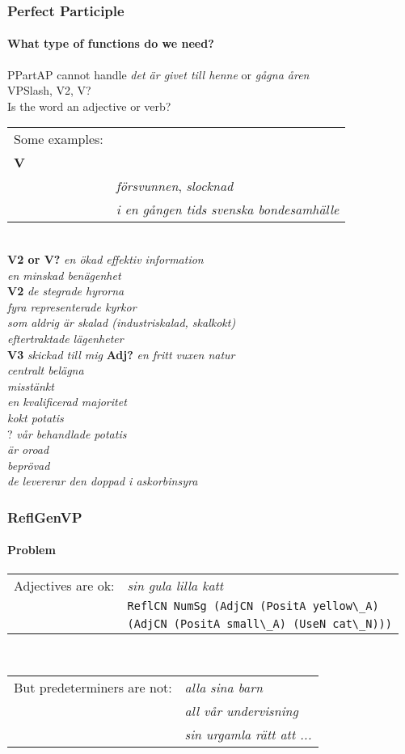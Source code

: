 \documentclass[10pt]{beamer}
\begin{document}
\begin{frame}
\frametitle{Perfect Participle}
\framesubtitle{What type of functions do we need?} 
PPartAP cannot handle \emph{det är givet till henne} or \emph{gågna åren} \\
VPSlash, V2, V?\\
Is the word an adjective or verb? \\
\begin{tabular}{ll}
Some examples: & \\
\textbf{V} & \\
& \emph{försvunnen}, \emph{slocknad} \\
& \emph{i en gången tids svenska bondesamhälle}  \\%
\end{tabular} \\
\textbf{V2 or V?}
\emph{en ökad effektiv information} \\
\emph{en minskad benägenhet} \\
\textbf{V2}
\emph{de stegrade hyrorna} \\
\emph{fyra representerade kyrkor} \\
\emph{som aldrig är skalad (industriskalad, skalkokt)} \\
\emph{eftertraktade lägenheter} \\
\textbf{V3}
\emph{skickad till mig}
\textbf{Adj?}
\emph{en fritt vuxen natur } \\
\emph{centralt belägna} \\
\emph{misstänkt } \\%
\emph{en kvalificerad majoritet} \\
\emph{kokt potatis} \\%
?
\emph{vår behandlade potatis} \\
\emph{är oroad} \\
\emph{beprövad}  \\ %
\emph{de levererar den doppad i askorbinsyra} \\
\end{frame}


\begin{frame}[containsverbatim]
\frametitle{ReflGenVP}
\framesubtitle{Problem} 
\begin{tabular}{ll}
Adjectives are ok: &  \emph{sin gula lilla katt} \\
& \small{\verb|ReflCN NumSg (AdjCN (PositA yellow\_A)|} \\
&\small{\verb|(AdjCN (PositA small\_A) (UseN cat\_N)))|}\\
\end{tabular} \\
\begin{tabular}{ll}
But predeterminers are not: & \emph{alla sina barn} \\
 & \emph{all vår undervisning} \\
 & \emph{sin urgamla rätt att ...}\\  %
\end{tabular} \\

\end{frame}
\end{document}
